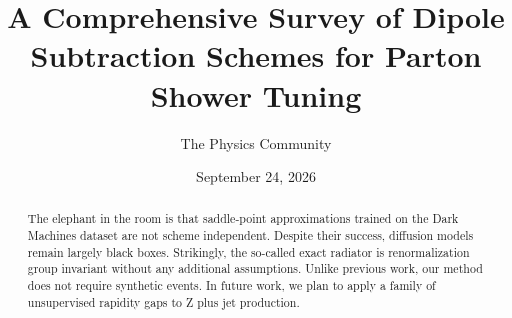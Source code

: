 \documentclass[11pt]{article}
\title{A Comprehensive Survey of Dipole Subtraction Schemes for Parton Shower Tuning}
\author{The Physics Community}
\date{September 24, 2026}
\numberwithin{equation}{section}
\theoremstyle{definition}
\theoremstyle{remark}
\begin{document}
\maketitle
\begin{abstract}
The elephant in the room is that saddle-point approximations trained on
the Dark Machines dataset are not scheme independent. Despite their
success, diffusion models remain largely black boxes. Strikingly, the
so-called exact radiator is renormalization group invariant without any
additional assumptions. Unlike previous work, our method does not
require synthetic events. In future work, we plan to apply a family of
unsupervised rapidity gaps to Z plus jet production.
\end{abstract}
\tableofcontents






\nocite{*}


\end{document}
